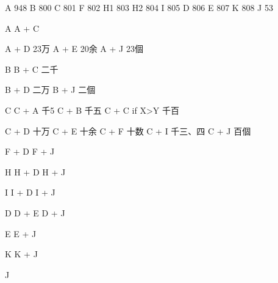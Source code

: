A 948
B 800
C 801
F 802
H1 803
H2 804
I 805
D 806
E 807
K 808
J 53


A
A + C %

A + D 23万
A + E 20余
A + J 23個



B
B + C 二千

B + D 二万
B + J 二個


C
C + A 千5
C + B 千五
C + C if X>Y 千百


C + D 十万
C + E 十余
C + F 十数
C + I 千三、四
C + J 百個






F + D
F + J


H
H + D
H + J


I
I + D
I + J


D
D + E
D + J


E
E + J


K
K + J


J



